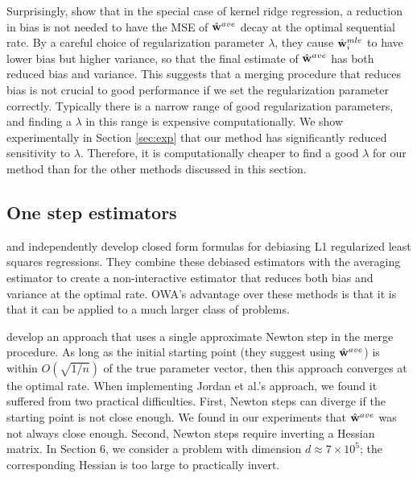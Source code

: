 \documentclass[thesis.tex]{subfiles}
\begin{document}
Surprisingly, \citet{zhang2013divide} show that in the special case of kernel ridge regression,
a reduction in bias is not needed to have the MSE of $\hat{\mathbf w}^{ave}$ decay at the optimal sequential rate.
By a careful choice of regularization parameter $\lambda$,
they cause $\hat{\mathbf w}^{mle}_i$ to have lower bias but higher variance,
so that the final estimate of $\hat{\mathbf w}^{ave}$ has both reduced bias and variance.
This suggests that a merging procedure that reduces bias is not crucial to good performance if we set the regularization parameter correctly.
Typically there is a narrow range of good regularization parameters,
and finding a $\lambda$ in this range is expensive computationally.
We show experimentally in Section \ref{sec:exp} that our method has significantly reduced sensitivity to $\lambda$.
Therefore, it is computationally cheaper to find a good $\lambda$ for our method than for the other methods discussed in this section.


\subsection{One step estimators}

\citet{lee2015communication} and \citet{battey2015distributed} independently develop closed form formulas for debiasing L1 regularized least squares regressions.
They combine these debiased estimators with the averaging estimator to create a non-interactive estimator that reduces both bias and variance at the optimal rate.
OWA's advantage over these methods is that it is that it can be applied to a much larger class of problems.

\citet{jordan2016communication} develop an approach that uses a single approximate Newton step in the merge procedure.
As long as the initial starting point (they suggest using $\hat{\mathbf w}^{ave}$) is within $O(\sqrt{1/n})$ of the true parameter vector,
then this approach converges at the optimal rate.
When implementing Jordan et al.'s approach, we found it suffered from two practical difficulties.
First, Newton steps can diverge if the starting point is not close enough.
We found in our experiments that $\hat{\mathbf w}^{ave}$ was not always close enough.
Second, Newton steps require inverting a Hessian matrix.
In Section 6, we consider a problem with dimension $d\approx7\times10^5$;
the corresponding Hessian is too large to practically invert.
\end{document}
